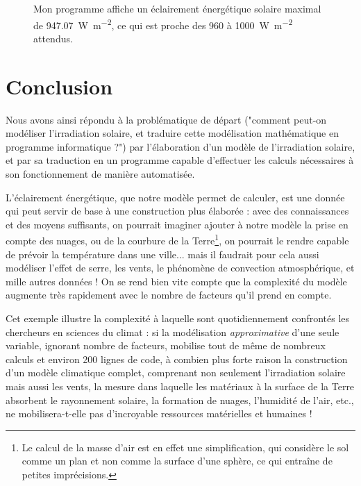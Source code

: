\documentclass[12pt]{article}
\begin{document}
\begin{figure}[!ht]
  \centering
  \caption{Mon programme affiche un éclairement énergétique solaire maximal de \SI{947.07}{\watt\per\square\meter}, ce qui est proche des 960 à \SI{1000}{\watt\per\square\meter} attendus.}
  \label{fig:maximum}
\end{figure}



\clearpage
\section{Conclusion}

Nous avons ainsi répondu à la problématique de départ ("comment peut-on modéliser l’irradiation solaire, et traduire cette modélisation mathématique en programme informatique ?") par l'élaboration d'un modèle de l'irradiation solaire, et par sa traduction en un programme capable d'effectuer les calculs nécessaires à son fonctionnement de manière automatisée.

L'éclairement énergétique, que notre modèle permet de calculer, est une donnée qui peut servir de base à une construction plus élaborée : avec des connaissances et des moyens suffisants, on pourrait imaginer ajouter à notre modèle la prise en compte des nuages, ou de la courbure de la Terre\footnote{Le calcul de la masse d'air est en effet une simplification, qui considère le sol comme un plan et non comme la surface d'une sphère, ce qui entraîne de petites imprécisions.}, on pourrait le rendre capable de prévoir la température dans une ville... mais il faudrait pour cela aussi modéliser l'effet de serre, les vents, le phénomène de convection atmosphérique, et mille autres données !
On se rend bien vite compte que la complexité du modèle augmente très rapidement avec le nombre de facteurs qu'il prend en compte.

Cet exemple illustre la complexité à laquelle sont quotidiennement confrontés les chercheurs en sciences du climat : si la modélisation \emph{approximative} d'une seule variable, ignorant nombre de facteurs, mobilise tout de même de nombreux calculs et environ 200 lignes de code, à combien plus forte raison la construction d'un modèle climatique complet, comprenant non seulement l'irradiation solaire mais aussi les vents, la mesure dans laquelle les matériaux à la surface de la Terre absorbent le rayonnement solaire, la formation de nuages, l'humidité de l'air, etc., ne mobilisera-t-elle pas d'incroyable ressources matérielles et humaines !
\end{document}
